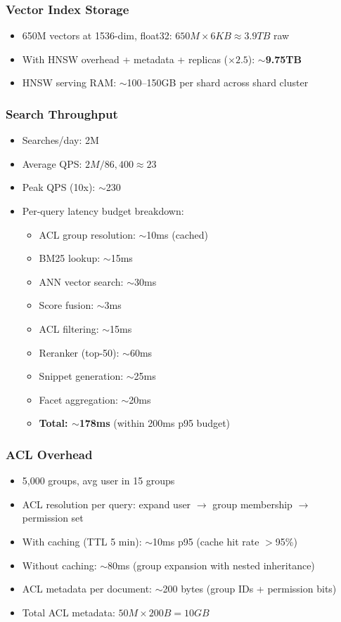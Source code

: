 \subsubsection*{Vector Index Storage}

\begin{itemize}
  \item 650M vectors at 1536-dim, float32: $650M \times 6KB \approx 3.9TB$ raw
  \item With HNSW overhead + metadata + replicas ($\times 2.5$): \textbf{$\sim$9.75TB}
  \item HNSW serving RAM: $\sim$100--150GB per shard across shard cluster
\end{itemize}

\subsubsection*{Search Throughput}

\begin{itemize}
  \item Searches/day: 2M
  \item Average QPS: $2M / 86{,}400 \approx 23$
  \item Peak QPS (10x): $\sim$230
  \item Per-query latency budget breakdown:
  \begin{itemize}
    \item ACL group resolution: $\sim$10ms (cached)
    \item BM25 lookup: $\sim$15ms
    \item ANN vector search: $\sim$30ms
    \item Score fusion: $\sim$3ms
    \item ACL filtering: $\sim$15ms
    \item Reranker (top-50): $\sim$60ms
    \item Snippet generation: $\sim$25ms
    \item Facet aggregation: $\sim$20ms
    \item \textbf{Total: $\sim$178ms} (within 200ms p95 budget)
  \end{itemize}
\end{itemize}

\subsubsection*{ACL Overhead}

\begin{itemize}
  \item 5,000 groups, avg user in 15 groups
  \item ACL resolution per query: expand user $\rightarrow$ group membership $\rightarrow$ permission set
  \item With caching (TTL 5 min): $\sim$10ms p95 (cache hit rate $>$95\%)
  \item Without caching: $\sim$80ms (group expansion with nested inheritance)
  \item ACL metadata per document: $\sim$200 bytes (group IDs + permission bits)
  \item Total ACL metadata: $50M \times 200B = 10GB$
\end{itemize}


